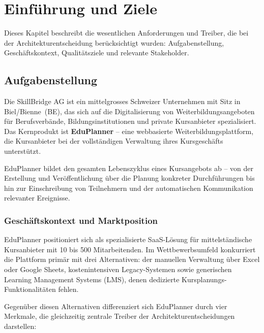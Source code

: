 \section{Einführung und Ziele}

Dieses Kapitel beschreibt die wesentlichen Anforderungen und Treiber, die bei der Architekturentscheidung berücksichtigt wurden: Aufgabenstellung, Geschäftskontext, Qualitätsziele und relevante Stakeholder.

\subsection{Aufgabenstellung}

Die SkillBridge AG ist ein mittelgrosses Schweizer Unternehmen mit Sitz in Biel/Bienne~(BE), das sich auf die Digitalisierung von Weiterbildungsangeboten für Berufsverbände, Bildungsinstitutionen und private Kursanbieter spezialisiert. Das Kernprodukt ist \textbf{EduPlanner} -- eine webbasierte Weiterbildungsplattform, die Kursanbieter bei der vollständigen Verwaltung ihres Kursgeschäfts unterstützt.

EduPlanner bildet den gesamten Lebenszyklus eines Kursangebots ab -- von der Erstellung und Veröffentlichung über die Planung konkreter Durchführungen bis hin zur Einschreibung von Teilnehmern und der automatischen Kommunikation relevanter Ereignisse.

\subsubsection{Geschäftskontext und Marktposition}

EduPlanner positioniert sich als spezialisierte SaaS-Lösung für mittelständische Kursanbieter
mit 10 bis 500 Mitarbeitenden. Im Wettbewerbsumfeld konkurriert die Plattform primär mit drei
Alternativen: der manuellen Verwaltung über Excel oder Google Sheets, kostenintensiven
Legacy-Systemen sowie generischen Learning Management Systems (LMS), denen dedizierte
Kursplanungs-Funktionalitäten fehlen.


Gegenüber diesen Alternativen differenziert sich EduPlanner durch vier Merkmale, die
gleichzeitig zentrale Treiber der Architekturentscheidungen darstellen:

